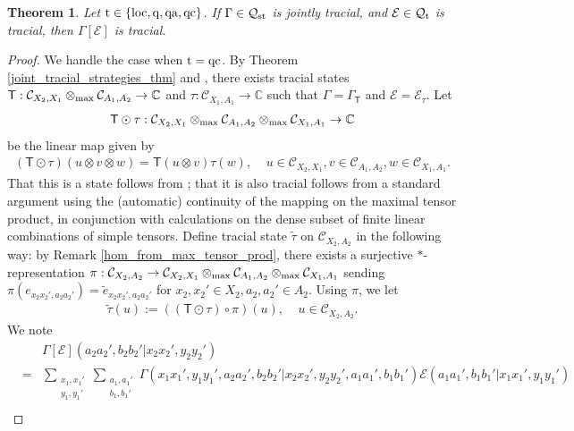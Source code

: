 \documentclass[11pt]{amsart}
\newtheorem{theorem}{Theorem}[section]
\newcommand{\cl}[1]{\mathcal{#1}}
\newcommand{\bb}[1]{\mathbb{#1}}
\begin{document}
\begin{theorem}\label{simulated_tracial}
Let ${\rm t} \in \{\rm loc, q, qa, qc\}$. If $\Gamma \in \cl{Q}_{\rm st}$ is jointly tracial, and $\cl{E} \in \cl{Q}_{\rm t}$ is tracial, then $\Gamma[\cl{E}]$ is tracial. 
\end{theorem}
\begin{proof}
We handle the case when ${\rm t} = {\rm qc}$. By Theorem \ref{joint_tracial_strategies_thm} and \cite[Theorem 4.1]{synch_bhtt}, there exists tracial states $\mathsf{T}: \cl{C}_{X_{2}, X_{1}}\otimes_{\rm max} \cl{C}_{A_{1}, A_{2}}\rightarrow \bb{C}$ and $\tau: \cl{C}_{X_{1}, A_{1}}\rightarrow \bb{C}$ such that $\Gamma = \Gamma_{\mathsf{T}}$ and $\cl{E} = \cl{E}_{\tau}$. Let 
\begin{gather*}
	\mathsf{T}\odot \tau : \cl{C}_{X_{2}, X_{1}}\otimes_{\rm max} \cl{C}_{A_{1}, A_{2}}\otimes_{\rm max} \cl{C}_{X_{1}, A_{1}}\rightarrow \bb{C}
\end{gather*}
\noindent be the linear map given by
\begin{gather*}
	(\mathsf{T}\odot \tau)(u\otimes v\otimes w) = \mathsf{T}(u\otimes v)\tau(w), \;\;\;\; u \in \cl{C}_{X_{2}, X_{1}}, v\in \cl{C}_{A_{1}, A_{2}}, w \in \cl{C}_{X_{1}, A_{1}}.
\end{gather*}
That this is a state follows from \cite[Proposition 4.23]{takesaki}; that it is also tracial follows from a standard argument using the (automatic) continuity of the mapping on the maximal tensor product, in conjunction with calculations on the dense subset of finite linear combinations of simple tensors. Define tracial state $\tilde{\tau}$ on $\cl{C}_{X_{2}, A_{2}}$ in the following way: by Remark \ref{hom_from_max_tensor_prod}, there exists a surjective $*$-representation $\pi: \cl{C}_{X_{2}, A_{2}}\rightarrow \cl{C}_{X_{2}, X_{1}}\otimes_{\rm max} \cl{C}_{A_{1}, A_{2}}\otimes_{\rm max} \cl{C}_{X_{1}, A_{1}}$ sending $\pi(e_{x_{2}x_{2}', a_{2}a_{2}'}) = \tilde{e}_{x_{2}x_{2}', a_{2}a_{2}'}$ for $x_{2}, x_{2}' \in X_{2}, a_{2}, a_{2}' \in A_{2}$. Using $\pi$, we let
\begin{gather}\label{constructed_tracial_state}
	\tilde{\tau}(u) := ((\mathsf{T}\odot \tau) \circ \pi)(u), \;\;\;\; u \in \cl{C}_{X_{2}, A_{2}}.
\end{gather}
\noindent We note
\begin{eqnarray*}
& &
\Gamma[\cl{E}](a_{2}a_{2}', b_{2}b_{2}'|x_{2}x_{2}', y_{2}y_{2}') \\
& = &
\sum\limits_{\substack{x_{1}, x_{1}' \\ y_{1}, y_{1}'}}\sum\limits_{\substack{a_{1}, a_{1}' \\ b_{1}, b_{1}'}}\Gamma(x_{1}x_{1}', y_{1}y_{1}', a_{2}a_{2}', b_{2}b_{2}'|x_{2}x_{2}', y_{2}y_{2}', a_{1}a_{1}', b_{1}b_{1}')\cl{E}(a_{1}a_{1}', b_{1}b_{1}'|x_{1}x_{1}', y_{1}y_{1}') \\

\end{eqnarray*}
\end{proof}
\end{document}
